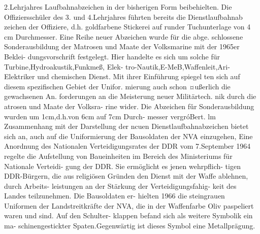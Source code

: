 2.Lehrjahres Laufbahnabzeichen in der bisherigen
Form beibehielten. Die Offiziersschüler des 3. und
4.Lehrjahres führten bereits die Dienstlaufbahnab
zeichen der Offiziere, d.h. goldfarbene Stickerei auf
runder Tuchunterlage von 4 cm Durchmesser.
Eine Reihe neuer Abzeichen wurde für die abge.
schlossene Sonderausbildung der Matrosen und
Maate der Volksmarine mit der 1965er Beklei-
dungsvorschrift festgelegt. Hier handelte es sich um
solche für Turbine,Hydroakustik,Funkmeß, Elek-
tro-Nautik,E-MeB,Waffenleit,Ari-Elektriker und
chemischen Dienst. Mit ihrer Einführung spiegel
ten sich auf diesem spezifischen Gebiet der Unifor.
mierung auch schon ¤ußerlich die gewachsenen An.
forderungen an die Meisterung neuer Militärtech.
nik durch die atrosen und Maate der Volksra-
rine wider. Die Abzeichen fǔr Sonderausbildung
wurden um 1cm,d.h.von 6cm auf 7cm Durch-
messer vergróBert.
lm Zusammenhang mit der Darstellung der
ncuen Dienstlaufbahnabzeichen
bietet sich
an,
auch auf die Uniformierung der Bausoldaten der NVA einzugehen, Eine Anordnung des Nationalen
Verteidigungsrates der DDR vom 7.September
1964 regelte die Aufstellung von Baueinheiten im
Bereich des Ministeriums für Nationale Verteidi-
gung der DDR. Sie ermöglicht es jenen wehrpflich-
tigen DDR-Bürgern, die aus religiösen Gründen
den Dienst mit der Waffe ablehnen, durch Arbeits-
leistungen an der Stärkung der Verteidigungsfahig-
keit des Landes teilzunehmen. Die Bausoldaten er-
hielten 1966 die steingrauen Uniformen der
Landstreitkräfte der NVA, die in der Waffenfarbe
Oliv paspeliert waren und sind. Auf den Schulter-
klappen befand sich als weitere Symbolik ein ma-
schinengestickter Spaten.Gegenwärtig ist dieses
Symbol eine Metallprägung.